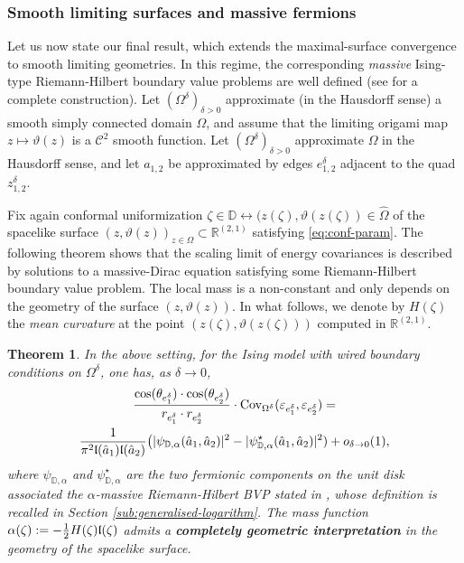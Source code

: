 \documentclass[reqno]{amsart}
\numberwithin{equation}{section}
\newtheorem{theo}{Theorem}[section]
\theoremstyle{definition}
\theoremstyle{remark}
\begin{document}
\medskip
\subsubsection{Smooth limiting surfaces and massive fermions}
Let us now state our final result, which extends the maximal-surface convergence to smooth limiting geometries. In this regime, the corresponding \emph{massive} Ising-type Riemann-Hilbert boundary value problems are well defined (see \cite{park2025near} for a complete construction). Let $(\Omega^\delta)_{\delta>0}$ approximate (in the Hausdorff sense) a smooth simply connected domain $\Omega$, and assume that the limiting origami map $z\mapsto \vartheta(z)$ is a $\mathcal C^2$ smooth function. Let $(\Omega^\delta)_{\delta>0}$ approximate $\Omega$ in the Hausdorff sense, and let $a_{1,2}$ be approximated by edges $e_{1,2}^\delta$ adjacent to the quad $z_{1,2}^\delta$.

Fix again conformal uniformization $\zeta \in \mathbb{D} \leftrightarrow ( z(\zeta),\vartheta(z(\zeta)) \in \widehat{\Omega}$
of the spacelike surface $ (z,\vartheta(z))_{z\in\Omega}
    \subset \mathbb R^{(2,1)}$ satisfying \eqref{eq:conf-param}. The following theorem shows that the scaling
limit of energy covariances is described by solutions to a massive-Dirac equation satisfying some Riemann-Hilbert boundary value problem. The local mass is a non-constant and only depends on the geometry of the surface $(z,\vartheta(z))$. In what follows, we denote by $H(\zeta)$ the \emph{mean curvature}  at the point $(z(\zeta),\vartheta(z(\zeta)))$  computed in $\mathbb{R}^{(2,1)}$.


\begin{theo}\label{thm:converger-energy-smooth-surface}
In the above setting, for the Ising model with wired boundary conditions on $\Omega^\delta$, one has, as $\delta \to 0$,
\begin{multline*}
		\frac{\cos(\theta_{e_1^\delta}) \cdot\cos(\theta_{e_2^\delta})}{r_{e_1^\delta} \cdot r_{e_2^\delta}}\cdot \mathrm{Cov}_{\Omega^\delta}(\varepsilon_{e_1^\delta},\varepsilon_{e_2^\delta}) = \\
		 \frac{1}{\pi^2 \frak{l}(\hat{a}_1)\frak{l}(\hat{a}_2)} \big(|\psi_{\mathbb{D},\alpha}(\hat{a}_1,\hat{a}_2)|^2 -|\psi^\star_{\mathbb{D},\alpha}(\hat{a}_1,\hat{a}_2)|^2) + o_{\delta \to 0}(1),
\end{multline*}
where $\psi_{\mathbb{D},\alpha}$ and $\psi^\star_{\mathbb{D},\alpha}$ are the two fermionic components on the unit disk associated the $\alpha$-massive Riemann-Hilbert BVP stated in \cite[Section 6.1]{park2025near}, whose definition is recalled in Section \ref{sub:generalised-logarithm}. The mass function $\alpha(\zeta) := -\frac{1}{2} H(\zeta)\frak{l}(\zeta) $ admits a \textbf{completely geometric interpretation} in the geometry of the spacelike surface.
\end{theo} 
\end{document}
